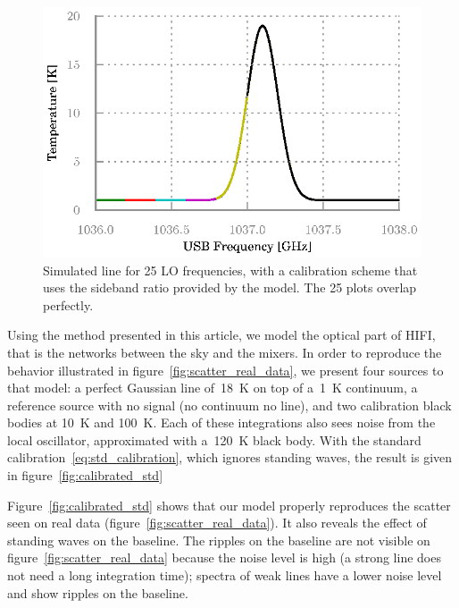 \documentclass[journal]{IEEEtran}
\begin{document}
\begin{figure}
    \includegraphics[width=\columnwidth]{bb-on_corrected-3}
    \caption{Simulated line for 25 LO frequencies, with a calibration scheme that uses the sideband ratio provided by the model.  The 25 plots overlap perfectly.}
    \label{fig:calibrated_sbr}
\end{figure}

Using the method presented in this article, we model the optical part of HIFI, that is the networks between the sky and the mixers.
In order to reproduce the behavior illustrated in figure~\ref{fig:scatter_real_data}, we present four sources to that model: a perfect Gaussian line of~\SI{18}{\kelvin} on top of a~\SI{1}{\kelvin} continuum, a reference source with no signal (no continuum no line), and two calibration black bodies at \SI{10}{\kelvin} and \SI{100}{\kelvin}.
Each of these integrations also sees noise from the local oscillator, approximated with a~\SI{120}{\kelvin} black body.
With the standard calibration~\eqref{eq:std_calibration}, which ignores standing waves, the result is given in figure~\ref{fig:calibrated_std}

Figure~\ref{fig:calibrated_std} shows that our model properly reproduces the scatter seen on real data (figure~\ref{fig:scatter_real_data}).
It also reveals the effect of standing waves on the baseline.
The ripples on the baseline are not visible on figure~\ref{fig:scatter_real_data} because the noise level is high (a strong line does not need a long integration time); spectra of weak lines have a lower noise level and show ripples on the baseline.
\end{document}

